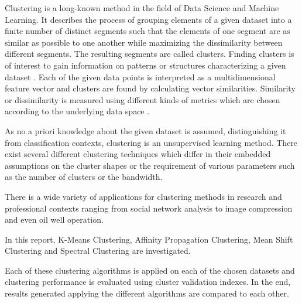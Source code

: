 Clustering is a long-known method in the field of Data Science and Machine Learning. It describes the process of grouping elements of a given dataset into a finite number of distinct segments such that the elements of one segment are as similar as possible to one another while maximizing the dissimilarity between different segments. The resulting segments are called clusters. Finding clusters is of interest to gain information on patterns or structures characterizing a given dataset \cite{madhulatha2012overview}.
Each of the given data points is interpreted as a multidimensional feature vector and clusters are found by calculating vector similarities. Similarity or dissimilarity is measured using different kinds of metrics which are chosen according to the underlying data space \cite{rokach2005Clustering}.

As no a priori knowledge about the given dataset is assumed, distinguishing it from classification contexts, clustering is an unsupervised learning method. There exist several different clustering techniques which differ in their embedded assumptions on the cluster shapes or the requirement of various parameters such as the number of clusters or the bandwidth.

There is a wide variety of applications for clustering methods in research and professional contexts ranging from social network analysis to image compression and even oil well operation.

In this report, K-Means Clustering, Affinity Propagation Clustering, Mean Shift Clustering and Spectral Clustering are investigated.

Each of these clustering algorithms is applied on each of the chosen datasets and clustering performance is evaluated using cluster validation indexes. In the end, results generated applying the different algorithms are compared to each other. 

% 
% 
% 

